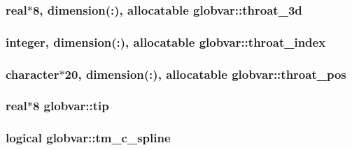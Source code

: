 \subsubsection[{throat\+\_\+3d}]{\setlength{\rightskip}{0pt plus 5cm}real$\ast$8, dimension(\+:), allocatable globvar\+::throat\+\_\+3d}\label{namespaceglobvar_a96fc48391a183ef7111ef81f05d289a5}
\hypertarget{namespaceglobvar_a63d910cfc844949f7d789af4f16e6695}{}
\subsubsection[{throat\+\_\+index}]{\setlength{\rightskip}{0pt plus 5cm}integer, dimension(\+:), allocatable globvar\+::throat\+\_\+index}\label{namespaceglobvar_a63d910cfc844949f7d789af4f16e6695}
\hypertarget{namespaceglobvar_a8e9e3ba0b38e35c9b6b0c02e62ffc1f8}{}
\subsubsection[{throat\+\_\+pos}]{\setlength{\rightskip}{0pt plus 5cm}character$\ast$20, dimension(\+:), allocatable globvar\+::throat\+\_\+pos}\label{namespaceglobvar_a8e9e3ba0b38e35c9b6b0c02e62ffc1f8}
\hypertarget{namespaceglobvar_ae899a4ed69eab45967a2e360c288f62f}{}
\subsubsection[{tip}]{\setlength{\rightskip}{0pt plus 5cm}real$\ast$8 globvar\+::tip}\label{namespaceglobvar_ae899a4ed69eab45967a2e360c288f62f}
\hypertarget{namespaceglobvar_a7ef07561b1935adec053ae70c03ec46f}{}
\subsubsection[{tm\+\_\+c\+\_\+spline}]{\setlength{\rightskip}{0pt plus 5cm}logical globvar\+::tm\+\_\+c\+\_\+spline}\label{namespaceglobvar_a7ef07561b1935adec053ae70c03ec46f}
\hypertarget{namespaceglobvar_a69a510c5294264ed214fd28b3eb2c837}{}
